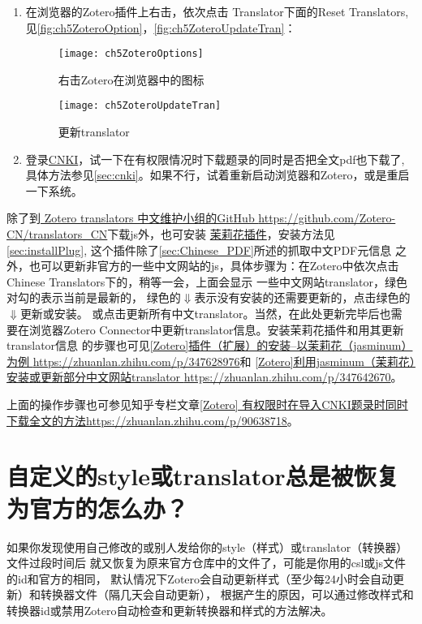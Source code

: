 \documentclass[theorem=false,mathfont=none,openany,sub3section]{easybook}
\begin{document}
{\begin{enumerate}
\begin{figure}[htbp]
	\end{figure}
	\item
	在浏览器的Zotero插件上右击，依次点击 Translator下面的Reset Translators,
	见\autoref{fig:ch5ZoteroOption}，\autoref{fig:ch5ZoteroUpdateTran}：
	\begin{figure}[htbp]
		\centering
		\texttt{[image: ch5ZoteroOptions]}
		\caption{右击Zotero在浏览器中的图标}
		\label{fig:ch5ZoteroOption}
	\end{figure}
	\begin{figure}[htbp]
		\centering
		\texttt{[image: ch5ZoteroUpdateTran]}
		\caption{更新translator}
		\label{fig:ch5ZoteroUpdateTran}
	\end{figure}
	\item
	登录\href{http://www.cnki.net}{CNKI}，试一下在有权限情况时下载题录的同时是否把全文pdf也下载了,
	具体方法参见\cref{sec:cnki}。如果不行，试着重新启动浏览器和Zotero，或是重启一下系统。
\end{enumerate}

除了到\href{https://github.com/Zotero-CN/translators_CN}{ Zotero translators 
	中文维护小组的GitHub 
	\url{ https://github.com/Zotero-CN/translators_CN}}下载js外，也可安装
\href{https://github.com/l0o0/jasminum/releases}{茉莉花插件}，安装方法见
\cref{sec:installPlug}, 这个插件除了\cref{sec:Chinese_PDF}所述的抓取中文PDF元信息
之外，也可以更新非官方的一些中文网站的js，具体步骤为：在Zotero中依次点击 Chinese Translators下的，稍等一会，上面会显示
一些中文网站translator，绿色对勾的表示当前是最新的，
绿色的$\Downarrow$表示没有安装的还需要更新的，点击绿色的$\Downarrow$更新或安装。
或点击更新所有中文translator。当然，在此处更新完毕后也需
要在浏览器Zotero Connector中更新translator信息。安装茉莉花插件和用其更新translator信息
的步骤也可见\href{https://zhuanlan.zhihu.com/p/347628976}
{[Zotero]插件（扩展）的安装--以茉莉花（jasminum）为例
	\url{https://zhuanlan.zhihu.com/p/347628976}}和
\href{https://zhuanlan.zhihu.com/p/347642670}
{[Zotero]利用jasminum（茉莉花）安装或更新部分中文网站translator
	\url{https://zhuanlan.zhihu.com/p/347642670}}。


上面的操作步骤也可参见知乎专栏文章\href{https://zhuanlan.zhihu.com/p/90638718}{[Zotero]
	有权限时在导入CNKI题录时同时下载全文的方法\url{https://zhuanlan.zhihu.com/p/90638718}}。

\section{自定义的style或translator总是被恢复为官方的怎么办？}\label{sec:reset_style}
如果你发现使用自己修改的或别人发给你的style（样式）或translator（转换器）文件过段时间后
就又恢复为原来官方仓库中的文件了，可能是你用的csl或js文件的id和官方的相同，
默认情况下Zotero会自动更新样式（至少每24小时会自动更新）和转换器文件（隔几天会自动更新），
根据产生的原因，可以通过修改样式和转换器id或禁用Zotero自动检查和更新转换器和样式的方法解决。

}
\end{document}
